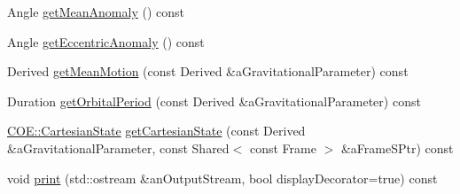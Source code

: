 \begin{DoxyCompactItemize}
\item 
Angle \hyperlink{classlibrary_1_1astro_1_1trajectory_1_1orbit_1_1models_1_1kepler_1_1_c_o_e_af5e71236c626912474e127135646e9ed}{get\+Mean\+Anomaly} () const
\item 
Angle \hyperlink{classlibrary_1_1astro_1_1trajectory_1_1orbit_1_1models_1_1kepler_1_1_c_o_e_a200caffdc35b91b9ea6b40bb7039ed2c}{get\+Eccentric\+Anomaly} () const
\item 
Derived \hyperlink{classlibrary_1_1astro_1_1trajectory_1_1orbit_1_1models_1_1kepler_1_1_c_o_e_ab7c60e9be04691ab0987639014215085}{get\+Mean\+Motion} (const Derived \&a\+Gravitational\+Parameter) const
\item 
Duration \hyperlink{classlibrary_1_1astro_1_1trajectory_1_1orbit_1_1models_1_1kepler_1_1_c_o_e_ab766ab9e115a534af6dbc6243e3f800b}{get\+Orbital\+Period} (const Derived \&a\+Gravitational\+Parameter) const
\item 
\hyperlink{classlibrary_1_1astro_1_1trajectory_1_1orbit_1_1models_1_1kepler_1_1_c_o_e_ac51b1d86203092966abcebb32f312ff4}{C\+O\+E\+::\+Cartesian\+State} \hyperlink{classlibrary_1_1astro_1_1trajectory_1_1orbit_1_1models_1_1kepler_1_1_c_o_e_a8c85e5625dc4f58c8bd5013387496ba9}{get\+Cartesian\+State} (const Derived \&a\+Gravitational\+Parameter, const Shared$<$ const Frame $>$ \&a\+Frame\+S\+Ptr) const
\item 
void \hyperlink{classlibrary_1_1astro_1_1trajectory_1_1orbit_1_1models_1_1kepler_1_1_c_o_e_ae654536e2cb0e891dc99f5f9055c8f1b}{print} (std\+::ostream \&an\+Output\+Stream, bool display\+Decorator=true) const
\end{DoxyCompactItemize}
